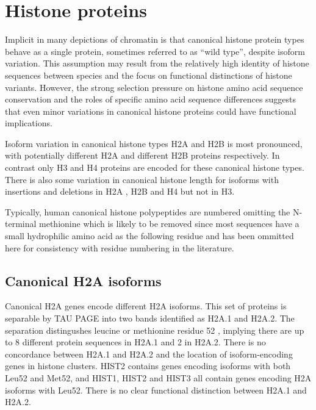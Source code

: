 \section{Histone proteins}

	Implicit in many depictions of chromatin is that 
	canonical histone protein types behave as a single protein, 
	sometimes referred to as ``wild type'', 
	despite isoform variation. 
	This assumption may result from the relatively high identity of histone sequences between species 
	and the focus on functional distinctions of histone variants. 
	However, the strong selection pressure on histone amino acid sequence conservation 
	and the roles of specific amino acid sequence differences  
	suggests that even minor variations in canonical histone proteins could have functional implications.
	
	Isoform variation in canonical histone types H2A and H2B is most pronounced, 
	with potentially \HTwoAUniqueProteins{} different H2A 
	and \HTwoBUniqueProteins{} different H2B proteins respectively. 
	In contrast only \HThreeUniqueProteins{} H3 and \HFourUniqueProteins{} H4 proteins 
	are encoded for these canonical histone types. 
	There is also some variation in canonical histone length for isoforms 
	with insertions and deletions in H2A , H2B and H4 but not in H3.

	Typically, human canonical histone polypeptides are numbered omitting the N-terminal methionine 
	which is likely to be removed since most sequences have 
	a small hydrophilic amino acid as the following residue  
	and has been ommitted here for consistency with residue numbering in the literature.

  \subsection{Canonical H2A isoforms}
	
	Canonical H2A genes encode \HTwoAUniqueProteins{} different H2A isoforms.
	This set of proteins is separable by TAU PAGE into two bands identified as H2A.1 and H2A.2. 
	The separation distingushes leucine or methionine residue 52 , 
	implying there are up to 8 different protein sequences in H2A.1 and 2 in H2A.2. 
	There is no concordance between H2A.1 and H2A.2 
	and the location of isoform-encoding genes in histone clusters. 
	HIST2 contains genes encoding isoforms with both Leu52 and Met52, 
	and HIST1, HIST2 and HIST3 all contain genes encoding H2A isoforms with Leu52. 
	There is no clear functional distinction between H2A.1 and H2A.2.

